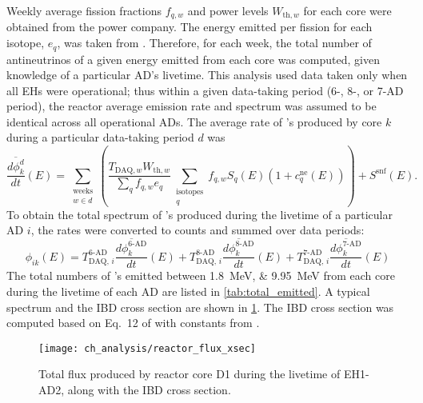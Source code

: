 Weekly average fission fractions $f_{q,w}$ and power levels $W_{\text{th},w}$ for each core
were obtained from the power company.
The energy emitted per fission for each isotope, $e_q$, was taken from
\cite{thermal_fission}.
Therefore, for each week, the total number of antineutrinos
of a given energy emitted from each core was computed,
given knowledge of a particular AD's livetime.
This analysis used data taken only when all EHs were operational;
thus within a given data-taking period (6-, 8-, or 7-AD period),
the reactor \nuebar{} average emission rate and spectrum was assumed to be identical
across all operational ADs.
The average rate of \nuebar{}'s produced by core $k$
during a particular data-taking period $d$ was
\begin{equation}\label{eq:reactor_spectrum_rate}
    \overline{\frac{d\phi_{k}^{d}}{dt}}(E) =
    \sum_{\substack{\text{weeks}\\w\in d}}\left(
        \frac{T_{\text{DAQ},w} W_{\text{th},w}}{\sum_q f_{q,w} e_q}
        \sum_{\substack{\text{isotopes}\\q}}
    f_{q,w} S_q(E) (1+c_q^{\text{ne}}(E))\right) + S^{\text{snf}}(E).
\end{equation}
To obtain the total spectrum of \nuebar{}'s produced
during the livetime of a particular AD $i$,
the rates were converted to counts and summed over data periods:
\begin{equation}\label{eq:reactor_spectrum}
    \phi_{ik}(E) =
    T_{\text{DAQ},\,i}^{\text{6-AD}}
    \overline{\frac{d\phi_{k}^{\text{6-AD}}}{dt}}(E)
    + T_{\text{DAQ},\,i}^{\text{8-AD}}
    \overline{\frac{d\phi_{k}^{\text{8-AD}}}{dt}}(E)
    + T_{\text{DAQ},\,i}^{\text{7-AD}}
    \overline{\frac{d\phi_{k}^{\text{7-AD}}}{dt}}(E)
\end{equation}
The total numbers of \nuebar{}'s emitted between \SIlist{1.8;9.95}{\MeV}
from each core during the livetime of each AD are listed in \cref{tab:total_emitted}.
A typical \nuebar{} spectrum and the IBD cross section are shown
in \cref{fig:reactor_flux_xsec}.
The IBD cross section was computed \cite{ibd_xsec_note}
based on Eq.~12 of \cite{ibd_xsec}
with constants from \cite{neutron_beta_theory,pdg2010}.

\begin{figure}
    \centering
    \texttt{[image: ch\_analysis/reactor\_flux\_xsec]}
    \caption[Total reactor \nuebar{} flux and IBD cross section]{
        Total \nuebar{} flux produced by reactor core D1
        during the livetime of EH1-AD2,
        along with the IBD cross section.
    }
    \label{fig:reactor_flux_xsec}
\end{figure}


